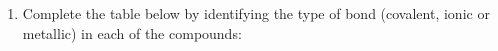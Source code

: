 \begin{enumerate}[noitemsep, label=\textbf{\arabic*}. ]
{    \addtocounter{footnote}{-0}
    
        }%
      
    \par
          \label{m38694*uid91}\item Complete the table below by identifying the type of bond (covalent, ionic or metallic) in each of the compounds:

    
      
    
    \setlength\mytablespace{4\tabcolsep}
    \addtolength\mytablespace{3\arrayrulewidth}
    \setlength\mytablewidth{\linewidth}
        
    
    \setlength\mytableroom{\mytablewidth}
    \addtolength\mytableroom{-\mytablespace}
    
    \setlength\myfixedwidth{0pt}
    \setlength\mystarwidth{\mytableroom}
        \addtolength\mystarwidth{-\myfixedwidth}
        \divide{}
        
    
\end{enumerate}
